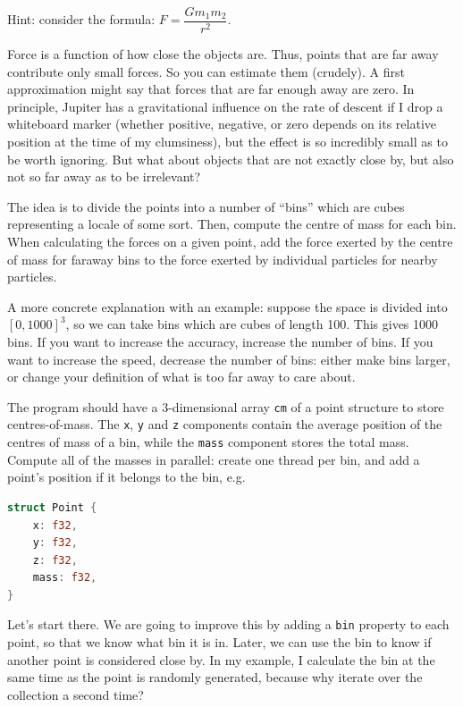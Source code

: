\documentclass[a4paper]{report}
\begin{document}
Hint: consider the formula: $F = \dfrac{Gm_{1}m_{2}}{r^{2}}$. 

Force is a function of how close the objects are. Thus, points that are far away contribute only small forces. So you can estimate them (crudely). A first approximation might say that forces that are far enough away are zero. In principle, Jupiter has a gravitational influence on the rate of descent if I drop a whiteboard marker (whether positive, negative, or zero depends on its relative position at the time of my clumsiness), but the effect is so incredibly small as to be worth ignoring. But what about objects that are not exactly close by, but also not so far away as to be irrelevant?

The idea is to divide the points into a number of ``bins'' which are cubes representing a locale of some sort. Then, compute the centre of mass for each bin. When calculating the forces on a given point, add the force exerted by the centre of mass for faraway bins to the force exerted by individual particles for nearby particles.

A more concrete explanation with an example: suppose the space  is divided into $[0, 1000]^3$, so we can take bins which are cubes of length 100. This gives 1000 bins. If you want to increase the accuracy, increase the number of bins. If you want to increase the speed, decrease the number of bins: either make bins larger, or change your definition of what is too far away to care about.

The program should have a 3-dimensional array {\tt cm} of a point structure to store centres-of-mass. The {\tt x}, {\tt y} and {\tt z}
components contain the average position of the centres of mass of a
bin, while the {\tt mass} component stores the total mass. Compute all of
the masses in parallel: create one thread per bin, and add a point's
position if it belongs to the bin, e.g.

\begin{lstlisting}[language=Rust]
struct Point {
    x: f32,
    y: f32,
    z: f32,
    mass: f32,
}
\end{lstlisting}

Let's start there. We are going to improve this by adding a \texttt{bin} property to each point, so that we know what bin it is in. Later, we can use the bin to know if another point is considered close by. In my example, I calculate the bin at the same time as the point is randomly generated, because why iterate over the collection a second time?
\end{document}
